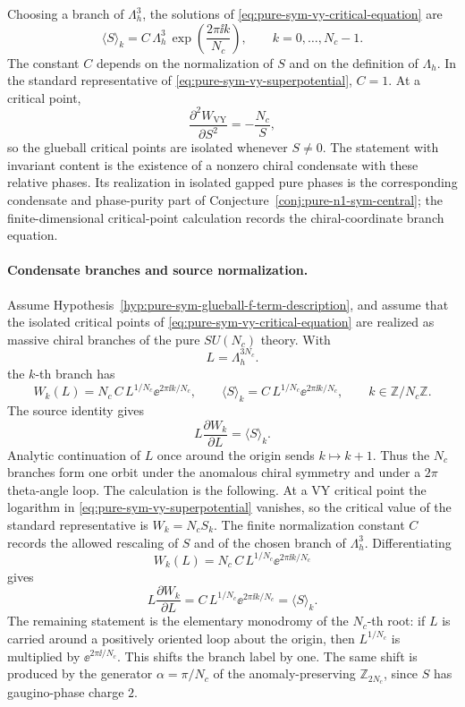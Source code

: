 Choosing a branch of \(\Lambda_h^3\), the solutions of
\eqref{eq:pure-sym-vy-critical-equation} are
\[
  \langle S\rangle_k
  =
  C\,\Lambda_h^3\,
  \exp\!\left(\frac{2\pi\ii k}{N_c}\right),
  \qquad
  k=0,\ldots,N_c-1 .
\]
The constant \(C\) depends on the normalization of \(S\) and on the definition
of \(\Lambda_h\).  In the standard representative of
\eqref{eq:pure-sym-vy-superpotential}, \(C=1\).  At a critical point,
\[
  \frac{\partial^2 W_{\mathrm{VY}}}{\partial S^2}
  =
  -\frac{N_c}{S},
\]
so the glueball critical points are isolated whenever \(S\neq0\).  The
statement with invariant content is the existence of a nonzero chiral
condensate with these relative phases.  Its realization in isolated gapped
pure phases is the corresponding condensate and phase-purity part of
Conjecture~\ref{conj:pure-n1-sym-central}; the finite-dimensional
critical-point calculation records the chiral-coordinate branch equation.

\paragraph{Condensate branches and source normalization.}
Assume Hypothesis~\ref{hyp:pure-sym-glueball-f-term-description}, and assume
that the isolated critical points of
\eqref{eq:pure-sym-vy-critical-equation} are realized as massive chiral
branches of the pure \(SU(N_c)\) theory.  With
\[
  L=\Lambda_h^{3N_c}.
\]
the \(k\)-th branch has
\[
  W_k(L)=N_c\,C\,L^{1/N_c}\ee^{2\pi\ii k/N_c},
  \qquad
  \langle S\rangle_k
  =
  C\,L^{1/N_c}\ee^{2\pi\ii k/N_c},
  \qquad k\in\mathbb Z/N_c\mathbb Z .
\]
The source identity gives
\[
  L\frac{\partial W_k}{\partial L}=\langle S\rangle_k .
\]
Analytic continuation of \(L\) once around the origin sends
\(k\mapsto k+1\).  Thus the \(N_c\) branches form one orbit under the
anomalous chiral symmetry and under a \(2\pi\) theta-angle loop.
The calculation is the following.  At a VY critical point the logarithm in
\eqref{eq:pure-sym-vy-superpotential} vanishes, so the critical value of the
standard representative is \(W_k=N_cS_k\).  The finite normalization
constant \(C\) records the allowed rescaling of \(S\) and of the chosen
branch of \(\Lambda_h^3\).  Differentiating
\[
  W_k(L)=N_c\,C\,L^{1/N_c}\ee^{2\pi\ii k/N_c}
\]
gives
\[
  L\frac{\partial W_k}{\partial L}
  =
  C\,L^{1/N_c}\ee^{2\pi\ii k/N_c}
  =
  \langle S\rangle_k .
\]
The remaining statement is the elementary monodromy of the \(N_c\)-th root:
if \(L\) is carried around a positively oriented loop about the origin, then
\(L^{1/N_c}\) is multiplied by \(\ee^{2\pi\ii/N_c}\).  This shifts the branch
label by one.  The same shift is produced by the generator
\(\alpha=\pi/N_c\) of the anomaly-preserving \(\mathbb Z_{2N_c}\), since
\(S\) has gaugino-phase charge \(2\).

